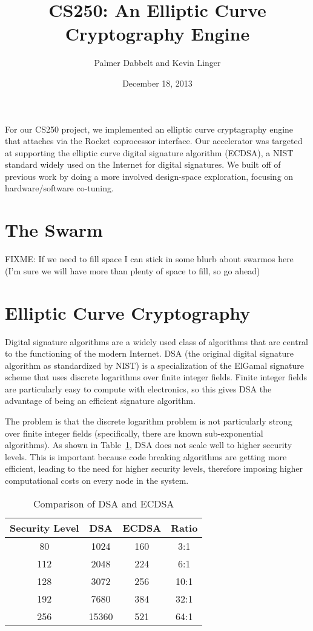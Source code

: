 \documentclass[twocolumn]{article}
\title{CS250: An Elliptic Curve Cryptography Engine}
\author{Palmer Dabbelt and Kevin Linger}
\date{December 18, 2013}
\begin{document}
\maketitle

For our CS250 project, we implemented an elliptic curve cryptagraphy
engine that attaches via the Rocket coprocessor interface.  Our
accelerator was targeted at supporting the elliptic curve digital
signature algorithm (ECDSA), a NIST standard widely used on the
Internet for digital signatures.  We built off of previous work by
doing a more involved design-space exploration, focusing on
hardware/software co-tuning.

\section{The Swarm}

FIXME: If we need to fill space I can stick in some blurb about
swarmos here
(I'm sure we will have more than plenty of space to fill, so go ahead)

\section{Elliptic Curve Cryptography}

Digital signature algorithms\cite{fips-186-3} are a widely used class
of algorithms that are central to the functioning of the modern
Internet.  DSA\cite{us-dsa} (the original digital signature algorithm
as standardized by NIST) is a specialization of the ElGamal signature
scheme\cite{elgamal-sig} that uses discrete logarithms over finite
integer fields.  Finite integer fields are particularly easy to
compute with electronics, so this gives DSA the advantage of being an
efficient signature algorithm.

The problem is that the discrete logarithm problem is not particularly
strong over finite integer fields (specifically, there are known
sub-exponential algorithms\cite{adleman-subexp}).  As shown in
Table~\ref{key-sizes}, DSA does not scale well to higher security
levels.  This is important because code breaking algorithms are
getting more efficient, leading to the need for higher security
levels, therefore imposing higher computational costs on every node in
the system. 

\begin{table}[h]
  \begin{center}
    \begin{tabular}{cccc}
      Security Level & DSA & ECDSA & Ratio \\
      \hline
      80 & 1024 & 160 & 3:1 \\
      112 & 2048 & 224 & 6:1 \\
      128 & 3072 & 256 & 10:1 \\
      192 & 7680 & 384 & 32:1 \\
      256 & 15360 & 521 & 64:1 \\
    \end{tabular}
  \end{center}

  \caption{Comparison of DSA and ECDSA\cite{nsa-case_for_ecc}
    \label{key-sizes}}
\end{table}
\end{document}
